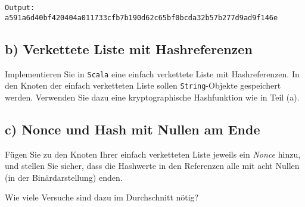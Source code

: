 
\begin{verbatim}
Output: a591a6d40bf420404a011733cfb7b190d62c65bf0bcda32b57b277d9ad9f146e
\end{verbatim}

\vspace{1em}

\newpage
\subsection*{b) Verkettete Liste mit Hashreferenzen}

Implementieren Sie in \texttt{Scala} eine einfach verkettete Liste mit Hashreferenzen.  
In den Knoten der einfach verketteten Liste sollen \texttt{String}-Objekte gespeichert werden.  
Verwenden Sie dazu eine kryptographische Hashfunktion wie in Teil (a).




\vspace{1em}

\subsection*{c) Nonce und Hash mit Nullen am Ende}

Fügen Sie zu den Knoten Ihrer einfach verketteten Liste jeweils ein \emph{Nonce} hinzu,  
und stellen Sie sicher, dass die Hashwerte in den Referenzen alle mit acht Nullen (in der Binärdarstellung) enden.  

Wie viele Versuche sind dazu im Durchschnitt nötig?
